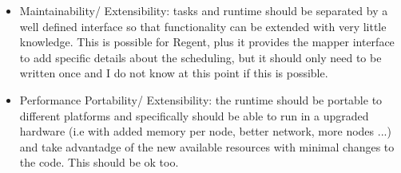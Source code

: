 \begin{itemize}
\item Maintainability/ Extensibility: tasks and runtime should be separated by a well defined interface so that functionality can be extended with very little knowledge. This is possible for Regent, plus it provides the mapper interface to add specific details about the scheduling, but it should only need to be written once and I do not know at this point if this is possible.
\item Performance Portability/ Extensibility: the runtime should be portable to different platforms and specifically should be able to run in a upgraded hardware (i.e with added memory per node, better network, more nodes ...) and take advantadge of the new available resources with minimal changes to the code. This should be ok too.
\end{itemize}